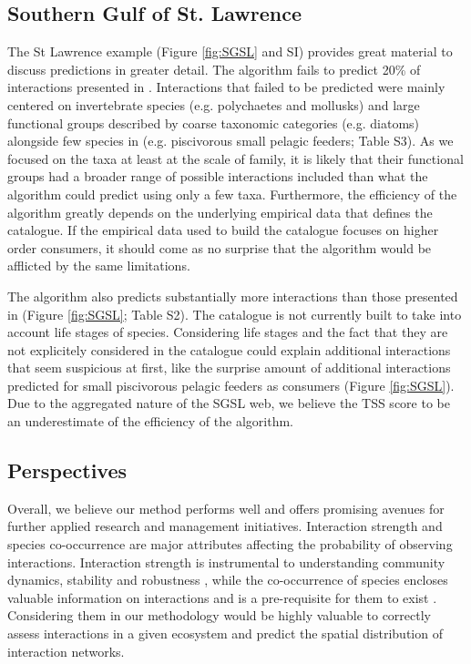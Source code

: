 \documentclass[letterpaper]{article}
\begin{document}
\subsection{Southern Gulf of St. Lawrence}
The St Lawrence example (Figure \ref{fig:SGSL} and SI) provides great material to discuss predictions in greater detail. The algorithm fails to predict 20\% of interactions presented in \citet{Savenkoff2004}. Interactions that failed to be predicted were mainly centered on invertebrate species (e.g. polychaetes and mollusks) and large functional groups described by coarse taxonomic categories (e.g. diatoms) alongside few species in \citet{Savenkoff2004} (e.g. piscivorous small pelagic feeders; Table S3). As we focused on the taxa at least at the scale of family, it is likely that their functional groups had a broader range of possible interactions included than what the algorithm could predict using only a few taxa. Furthermore, the efficiency of the algorithm greatly depends on the underlying empirical data that defines the catalogue. If the empirical data used to build the catalogue focuses on higher order consumers, it should come as no surprise that the algorithm would be afflicted by the same limitations.

The algorithm also predicts substantially more interactions than those presented in \citet{Savenkoff2004} (Figure \ref{fig:SGSL}; Table S2). The catalogue is not currently built to take into account life stages of species. Considering life stages and the fact that they are not explicitely considered in the catalogue could explain additional interactions that seem suspicious at first, like the surprise amount of additional interactions predicted for small piscivorous pelagic feeders as consumers (Figure \ref{fig:SGSL}). Due to the aggregated nature of the SGSL web, we believe the TSS score to be an underestimate of the efficiency of the algorithm.

\subsection{Perspectives}
Overall, we believe our method performs well and offers promising avenues for further applied research and management initiatives. Interaction strength and species co-occurrence are major attributes affecting the probability of observing interactions. Interaction strength is instrumental to understanding community dynamics, stability and robustness \citep{Laska1998, Morales-Castilla2015}, while the co-occurrence of species encloses valuable information on interactions and is a pre-requisite for them to exist \citep{Cazelles2016}. Considering them in our methodology would be highly valuable to correctly assess interactions in a given ecosystem and predict the spatial distribution of interaction networks.
\end{document}
